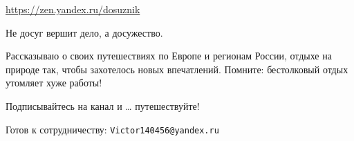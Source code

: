  
 
 
 
 
\url{https://zen.yandex.ru/dosuznik}

Не досуг вершит дело, а досужество.

Рассказываю о своих путешествиях по Европе и регионам России, отдыхе на природе
так, чтобы захотелось новых впечатлений. Помните: бестолковый отдых утомляет
хуже работы!

Подписывайтесь на канал и … путешествуйте!

Готов к сотрудничеству: \verb|Victor140456@yandex.ru|
